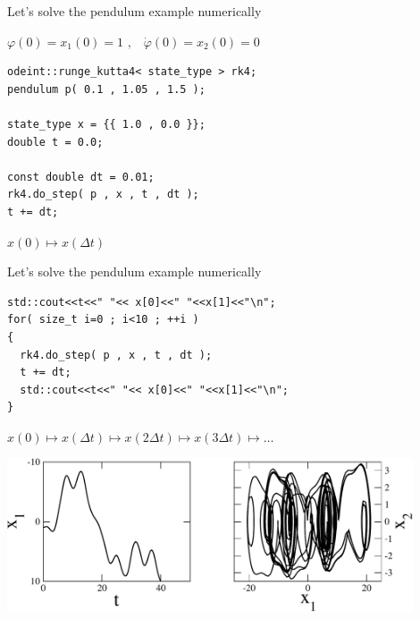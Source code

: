 \documentclass{beamer}
\begin{document}
\begin{frame}[fragile]
 \centerline{ \Large Let's solve the pendulum example numerically}

\vspace{2ex}
$\varphi(0) = x_1(0) = 1 \,\, \text{,} \quad \dot{\varphi}(0) = x_2(0) = 0$
\vspace{2ex}

\begin{lstlisting}
odeint::runge_kutta4< state_type > rk4;
pendulum p( 0.1 , 1.05 , 1.5 );

state_type x = {{ 1.0 , 0.0 }};
double t = 0.0;

const double dt = 0.01;
rk4.do_step( p , x , t , dt );
t += dt;
\end{lstlisting}

\vspace{2ex}

\centerline{$x(0) \mapsto x(\Delta t)$}

\end{frame}

\begin{frame}[fragile]
 \centerline{ \Large Let's solve the pendulum example numerically}

\vspace{1ex}


\begin{lstlisting}
std::cout<<t<<" "<< x[0]<<" "<<x[1]<<"\n";
for( size_t i=0 ; i<10 ; ++i )
{
  rk4.do_step( p , x , t , dt );
  t += dt;
  std::cout<<t<<" "<< x[0]<<" "<<x[1]<<"\n";
}
\end{lstlisting}

\vspace{.5ex}

\centerline{$x(0) \mapsto x(\Delta t) \mapsto x(2\Delta t) \mapsto x(3\Delta t) \mapsto \dots$}

\pause

\vspace{1ex}
\centerline{\includegraphics[draft=false,width=0.9\textwidth]{damped_driven.pdf}}

\end{frame}
\end{document}
